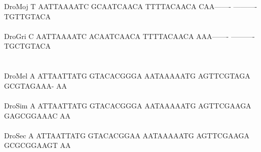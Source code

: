 \documentclass[11pt,twoside,reqno,a4paper]{article}
\begin{document}
{DroMoj	T	AATTAAAATC	GCAATCAACA	TTTTACAACA	CAA-------	----------	TGTTGTACA\\
\hspace*{7\charwidth}\hspace*{1\charwidth}\hspace*{1\charwidth}\hspace*{1\charwidth}\hspace*{1\charwidth}\hspace*{1\charwidth}\hspace*{1\charwidth}\\
DroGri	C	AATTAAAATC	ACAATCAACA	TTTTACAACA	AAA-------	----------	TGCTGTACA\\
\hspace*{7\charwidth}\hspace*{1\charwidth}\hspace*{1\charwidth}\hspace*{1\charwidth}\hspace*{1\charwidth}\hspace*{1\charwidth}\hspace*{1\charwidth}\\
\\
DroMel	A	ATTAATTATG	GTACACGGGA	AATAAAAATG	AGTTCGTAGA	GCGTAGAAA-	AA\\
\hspace*{7\charwidth}\hspace*{1\charwidth}\hspace*{1\charwidth}\hspace*{1\charwidth}\hspace*{1\charwidth}\hspace*{1\charwidth}\hspace*{1\charwidth}\\
DroSim	A	ATTAATTATG	GTACACGGGA	AATAAAAATG	AGTTCGAAGA	GAGCGGAAAC	AA\\
\hspace*{7\charwidth}\hspace*{1\charwidth}\hspace*{1\charwidth}\hspace*{1\charwidth}\hspace*{1\charwidth}\hspace*{1\charwidth}\hspace*{1\charwidth}\\
DroSec	A	ATTAATTATG	GTACACGGAA	AATAAAAATG	AGTTCGAAGA	GCGCGGAAGT	AA\\
\hspace*{7\charwidth}\hspace*{1\charwidth}\hspace*{1\charwidth}\hspace*{1\charwidth}\hspace*{1\charwidth}\hspace*{1\charwidth}\hspace*{1\charwidth}\\
}
\end{document}
